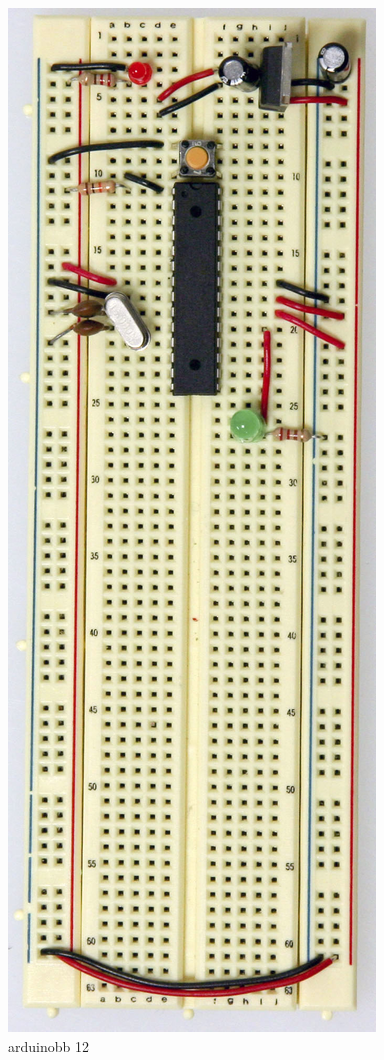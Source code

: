 \begin{figure}[!htb]
 \centering
 \includegraphics[scale=0.3]{img/arduino_breadboard/arduinobb_12.jpg}
 \caption{arduinobb 12}
 \label{arduinobb 12}
\end{figure}


